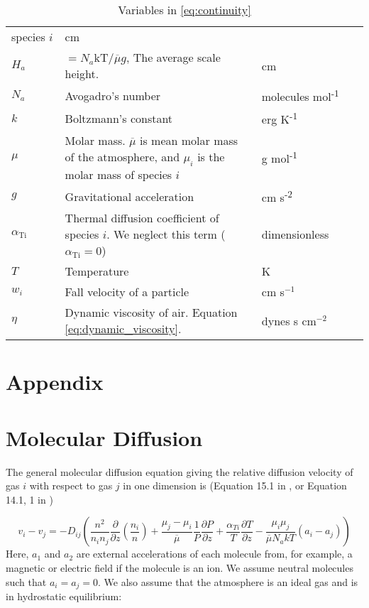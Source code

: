 \documentclass{article}
\begin{document}
\begin{table}
\begin{tabularx}{\linewidth}{p{0.15\linewidth} | p{0.55\linewidth} | p{0.3\linewidth}}
species \(i\) & cm \\
\(H_{a}\) & \(= N_{a}\text{kT}\text{/}\overline{\mu}g\), The average
scale height. & cm \\
\(N_{a}\) & Avogadro's number & molecules
mol\textsuperscript{-1} \\
\(k\) & Boltzmann's constant & erg K\textsuperscript{-1} \\
\(\mu\) & Molar mass. \(\overline{\mu}\) is mean molar mass of the
atmosphere, and \(\mu_{i}\) is the molar mass of species \(i\) & g
mol\textsuperscript{-1} \\
\(g\) & Gravitational acceleration & cm
s\textsuperscript{-2} \\
\(\alpha_{\text{Ti}}\) & Thermal diffusion coefficient of species \(i\).
We neglect this term (\(\alpha_{\text{Ti}} = 0\)) &
dimensionless \\
\(T\) & Temperature & K \\
$w_i$ & Fall velocity of a particle & cm s$^{-1}$ \\
$\eta$ & Dynamic viscosity of air. Equation \eqref{eq:dynamic_viscosity}. & dynes s cm$^{-2}$ \\
\end{tabularx}
\caption{Variables in \eqref{eq:continuity}}
\label{tab:variables}
\end{table}

\appendix
\section*{Appendix}

\section{Molecular Diffusion} \label{sec:molecular_diffusion}

The general molecular diffusion equation giving the relative diffusion velocity of gas $i$ with respect to gas $j$ in one dimension is (Equation 15.1 in \cite{Banks_2013}, or Equation 14.1, 1 in \cite{Chapman_1990})

\begin{equation} \label{eq:molec_diffusion_general}
  v_i - v_j = -D_{ij} \left( \frac{n^2}{n_i n_j} \frac{\partial}{\partial z} \left(\frac{n_i}{n}\right) + \frac{\mu_j - \mu_i}{\overline{\mu}} \frac{1}{P} \frac{\partial P}{\partial z} + \frac{\alpha_{Ti}}{T} \frac{\partial T}{\partial z} - \frac{\mu_i \mu_j}{\overline{\mu} N_a k T} (a_i - a_j)\right)
\end{equation}
Here, $a_1$ and $a_2$ are external accelerations of each molecule from, for example, a magnetic or electric field if the molecule is an ion. We assume neutral molecules such that $a_i = a_j = 0$. We also assume that the atmosphere is an ideal gas and is in hydrostatic equilibrium:
\end{document}
